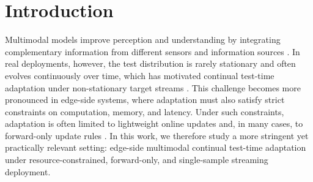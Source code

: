 \section{Introduction}

Multimodal models improve perception and understanding by integrating complementary information from different sensors and information sources \citep{baltrusaitis2019multimodal}. In real deployments, however, the test distribution is rarely stationary and often evolves continuously over time, which has motivated continual test-time adaptation under non-stationary target streams \citep{wang2022continualtta}. This challenge becomes more pronounced in edge-side systems, where adaptation must also satisfy strict constraints on computation, memory, and latency. Under such constraints, adaptation is often limited to lightweight online updates and, in many cases, to forward-only update rules \citep{niu2024forwardonly}. In this work, we therefore study a more stringent yet practically relevant setting: edge-side multimodal continual test-time adaptation under resource-constrained, forward-only, and single-sample streaming deployment.


